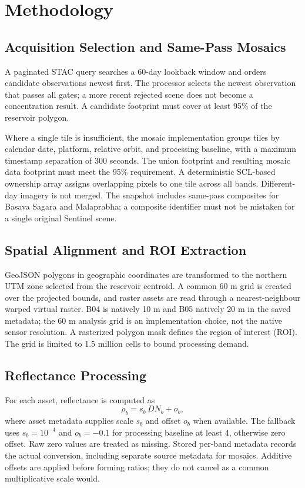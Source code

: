 \documentclass[conference]{IEEEtran}
\begin{document}
\section{Methodology}\label{sec:method}
\subsection{Acquisition Selection and Same-Pass Mosaics}
A paginated STAC query searches a 60-day lookback window and orders candidate observations newest first. The processor selects the newest observation that passes all gates; a more recent rejected scene does not become a concentration result. A candidate footprint must cover at least 95\% of the reservoir polygon.

Where a single tile is insufficient, the mosaic implementation groups tiles by calendar date, platform, relative orbit, and processing baseline, with a maximum timestamp separation of 300 seconds. The union footprint and resulting mosaic data footprint must meet the 95\% requirement. A deterministic SCL-based ownership array assigns overlapping pixels to one tile across all bands. Different-day imagery is not merged. The snapshot includes same-pass composites for Basava Sagara and Malaprabha; a composite identifier must not be mistaken for a single original Sentinel scene.

\subsection{Spatial Alignment and ROI Extraction}
GeoJSON polygons in geographic coordinates are transformed to the northern UTM zone selected from the reservoir centroid. A common 60 m grid is created over the projected bounds, and raster assets are read through a nearest-neighbour warped virtual raster. B04 is natively 10 m and B05 natively 20 m in the saved metadata; the 60 m analysis grid is an implementation choice, not the native sensor resolution. A rasterized polygon mask defines the region of interest (ROI). The grid is limited to 1.5 million cells to bound processing demand.

\subsection{Reflectance Processing}
For each asset, reflectance is computed as
\begin{equation}
\rho_b=s_b\,DN_b+o_b,\label{eq:rho}
\end{equation}
where asset metadata supplies scale $s_b$ and offset $o_b$ when available. The fallback uses $s_b=10^{-4}$ and $o_b=-0.1$ for processing baseline at least 4, otherwise zero offset. Raw zero values are treated as missing. Stored per-band metadata records the actual conversion, including separate source metadata for mosaics. Additive offsets are applied before forming ratios; they do not cancel as a common multiplicative scale would.
\end{document}
